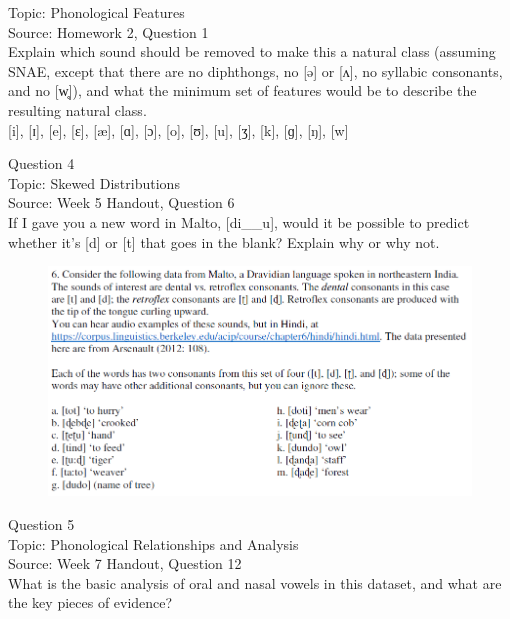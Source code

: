 \documentclass[12pt]{article}
\begin{document}
Topic: Phonological Features\\
Source: Homework 2, Question 1\\

Explain which sound should be removed to make this a natural class (assuming SNAE, except that there are no diphthongs, no [ə] or [ʌ], no syllabic consonants, and no [w̥]), and what the minimum set of features would be to describe the resulting natural class.\\

{[i]}, {[ɪ]}, {[e]}, {[ɛ]}, {[æ]}, {[ɑ]}, {[ɔ]}, {[o]}, {[ʊ]}, {[u]}, {[ʒ]}, {[k]}, {[ɡ]}, {[ŋ]}, {[w]}


\newpage

{\large Question 4}\\

Topic: Skewed Distributions\\
Source: Week 5 Handout, Question 6\\

If I gave you a new word in Malto, [di\_\_u], would it be possible to predict whether it's [d] or [t] that goes in the blank? Explain why or why not.\\

\begin{figure}[H]
\includegraphics{../images/malto.png}
\end{figure}

\newpage

{\large Question 5}\\

Topic: Phonological Relationships and Analysis\\
Source: Week 7 Handout, Question 12\\

What is the basic analysis of oral and nasal vowels in this dataset, and what are the key pieces of evidence?\\
\end{document}
